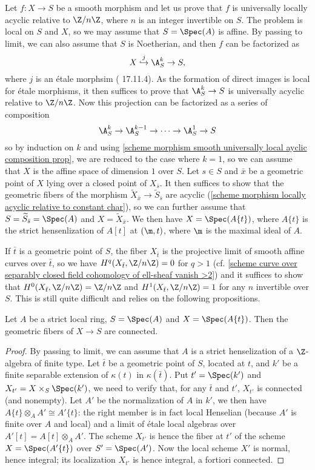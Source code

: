 Let $f:X\to S$ be a smooth morphism and let us prove that $f$ is universally locally acyclic relative to $\Z/n\Z$, where $n$ is an integer invertible on $S$. The problem is local on $S$ and $X$, so we may assume that $S=\Spec(A)$ is affine. By passing to limit, we can also assume that $S$ is Noetherian, and then $f$ can be factorized as
\[X\stackrel{j}{\hookrightarrow}\A_S^k\to S,\]
where $j$ is an \'etale morphsim (\cite{EGA4-4} 17.11.4). As the formation of direct images is local for \'etale morphisms, it then suffices to prove that $\A_S^k\to S$ is universally acyclic relative to $\Z/n\Z$. Now this projection can be factorized as a series of composition
\[\A_S^k\to\A_S^{k-1}\to\cdots\to\A_S^1\to S\]
so by induction on $k$ and using \cref{scheme morphism smooth universally local ayclic composition prop}, we are reduced to the case where $k=1$, so we can assume that $X$ is the affine space of dimension $1$ over $S$. Let $s\in S$ and $\bar{x}$ be a geometric point of $X$ lying over a closed point of $X_{\bar{s}}$. It then suffices to show that the geometric fibers of the morphism $\widetilde{X}_{\bar{x}}\to\widetilde{S}_{\bar{s}}$ are acyclic (\cref{scheme morphism locally acyclic relative to constant char}), so we can further assume that $S=\widetilde{S}_{\bar{s}}=\Spec(A)$ and $X=\widetilde{X}_{\bar{x}}$. We then have $X=\Spec(A\{t\})$, where $A\{t\}$ is the strict hensenlization of $A[t]$ at $(\m,t)$, where $\m$ is the maximal ideal of $A$.\par
If $\bar{t}$ is a geometric point of $S$, the fiber $X_{\bar{t}}$ is the projective limit of smooth affine curves over $\bar{t}$, so we have $H^q(X_{\bar{t}},\Z/n\Z)=0$ for $q>1$ (cf. \cref{scheme curve over separably closed field cohomology of ell-sheaf vanish >2}) and it suffices to show that $H^0(X_{\bar{t}},\Z/n\Z)=\Z/n\Z$ and $H^1(X_{\bar{t}},\Z/n\Z)=1$ for any $n$ invertible over $S$. This is still quite difficult and relies on the following propositions.

\begin{proposition}\label{scheme strict local affine space geometric fiber connected}
Let $A$ be a strict local ring, $S=\Spec(A)$ and $X=\Spec(A\{t\})$. Then the geometric fibers of $X\to S$ are connected.
\end{proposition}
\begin{proof}
By passing to limit, we can assume that $A$ is a strict henselization of a $\Z$-algebra of finite type. Let $\bar{t}$ be a geometric point of $S$, located at $t$, and $k'$ be a finite separable extension of $\kappa(t)$ in $\kappa(\bar{t})$. Put $t'=\Spec(k')$ and $X_{t'}=X\times_S\Spec(k')$, we need to verify that, for any $\bar{t}$ and $t'$, $X_{t'}$ is connected (and nonempty). Let $A'$ be the normalization of $A$ in $k'$, we then have $A\{t\}\otimes_AA'\cong A'\{t\}$: the right member is in fact local Henselian (because $A'$ is finite over $A$ and local) and a limit of \'etale local algebras over $A'[t]=A[t]\otimes_AA'$. The scheme $X_{t'}$ is hence the fiber at $t'$ of the scheme $X=\Spec(A'\{t\})$ over $S'=\Spec(A')$. Now the local scheme $X'$ is normal, hence integral; its localization $X_{t'}$ is hence integral, a fortiori connected. 
\end{proof}

